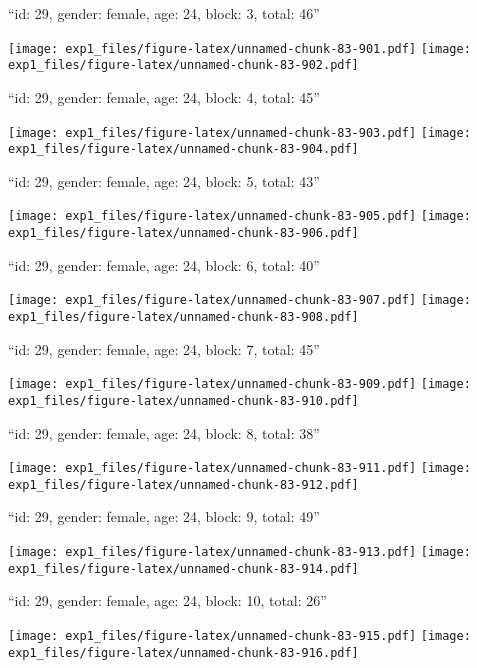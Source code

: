 \documentclass[11pt,,]{article}
\begin{document}
\newpage
[1] 

``id: 29, gender: female, age: 24, block: 3, total: 46''

\texttt{[image: exp1\_files/figure-latex/unnamed-chunk-83-901.pdf]}
\texttt{[image: exp1\_files/figure-latex/unnamed-chunk-83-902.pdf]}

\newpage
[1] 

``id: 29, gender: female, age: 24, block: 4, total: 45''

\texttt{[image: exp1\_files/figure-latex/unnamed-chunk-83-903.pdf]}
\texttt{[image: exp1\_files/figure-latex/unnamed-chunk-83-904.pdf]}

\newpage
[1] 

``id: 29, gender: female, age: 24, block: 5, total: 43''

\texttt{[image: exp1\_files/figure-latex/unnamed-chunk-83-905.pdf]}
\texttt{[image: exp1\_files/figure-latex/unnamed-chunk-83-906.pdf]}

\newpage
[1] 

``id: 29, gender: female, age: 24, block: 6, total: 40''

\texttt{[image: exp1\_files/figure-latex/unnamed-chunk-83-907.pdf]}
\texttt{[image: exp1\_files/figure-latex/unnamed-chunk-83-908.pdf]}

\newpage
[1] 

``id: 29, gender: female, age: 24, block: 7, total: 45''

\texttt{[image: exp1\_files/figure-latex/unnamed-chunk-83-909.pdf]}
\texttt{[image: exp1\_files/figure-latex/unnamed-chunk-83-910.pdf]}

\newpage
[1] 

``id: 29, gender: female, age: 24, block: 8, total: 38''

\texttt{[image: exp1\_files/figure-latex/unnamed-chunk-83-911.pdf]}
\texttt{[image: exp1\_files/figure-latex/unnamed-chunk-83-912.pdf]}

\newpage
[1] 

``id: 29, gender: female, age: 24, block: 9, total: 49''

\texttt{[image: exp1\_files/figure-latex/unnamed-chunk-83-913.pdf]}
\texttt{[image: exp1\_files/figure-latex/unnamed-chunk-83-914.pdf]}

\newpage
[1] 

``id: 29, gender: female, age: 24, block: 10, total: 26''

\texttt{[image: exp1\_files/figure-latex/unnamed-chunk-83-915.pdf]}
\texttt{[image: exp1\_files/figure-latex/unnamed-chunk-83-916.pdf]}
\end{document}

